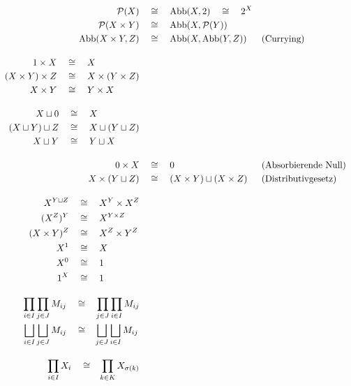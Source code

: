 \begin{align*}
    \calP(X) & \quad\cong\quad \Abb(X,2) \quad\cong\quad 2^X \\
    \calP(X\times Y) & \quad\cong\quad \Abb(X,\calP(Y)) \\
    \Abb(X\times Y,Z) & \quad\cong\quad \Abb(X,\Abb(Y,Z)) && (\text{Currying}) \\[1em]
    \begin{split}
        1 \times X & \quad\cong\quad X \\
        (X\times Y)\times Z & \quad\cong\quad X\times (Y\times Z) \\
        X\times Y & \quad\cong\quad Y\times X
    \end{split} \\[1em]
    \begin{split}
        X\sqcup 0 & \quad\cong\quad X \\
        (X\sqcup Y)\sqcup Z & \quad\cong\quad X\sqcup (Y\sqcup Z) \\
        X \sqcup Y & \quad\cong\quad Y\sqcup X
    \end{split} \\[1em]
        0 \times X & \quad\cong\quad 0 && (\text{Absorbierende Null}) \\
        X \times (Y\sqcup Z) & \quad\cong\quad (X\times Y)\sqcup (X\times Z) && (\text{Distributivgesetz}) \\[1em]
    \begin{split}
        X^{Y\sqcup Z} & \quad\cong\quad X^Y \times X^Z \\
        (X^Z)^Y & \quad\cong\quad X^{Y\times Z} \\
        (X\times Y)^Z & \quad\cong\quad X^Z \times Y^Z \\
        X^1 & \quad\cong\quad X \\
        X^0 & \quad\cong\quad 1 \\
        1^X & \quad\cong\quad 1
    \end{split} \\[1em]
    \begin{split}
        \prod_{i\in I} \prod_{j\in J} M_{ij} & \quad\cong\quad \smashoperator[l]{\prod_{j\in J}} \prod_{i\in I} M_{ij} \\
        \bigsqcup_{i\in I} \bigsqcup_{j\in J} M_{ij} & \quad\cong\quad \smashoperator[l]{\bigsqcup_{j\in J}} \bigsqcup_{i\in I} M_{ij}
    \end{split} \\[1em]
    \begin{split}
    \prod_{i\in I} X_i & \quad\cong\quad \smashoperator[l]{\prod_{k\in K}} X_{\sigma(k)} \\

\end{split}
\end{align*}
